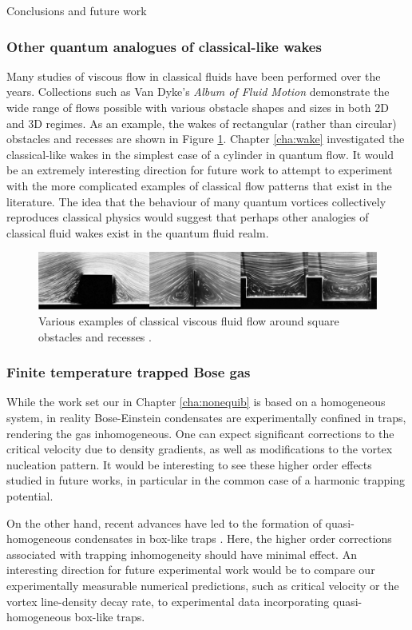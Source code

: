 \begin{chapter}{\label{cha:conc}Conclusions and future work}
\subsubsection{Other quantum analogues of classical-like wakes}
Many studies of viscous flow in classical fluids have been performed over the years. Collections such as Van Dyke's {\it Album of Fluid Motion} \cite{nagib} demonstrate the wide range of flows possible with various obstacle shapes and sizes in both 2D and 3D regimes. As an example, the wakes of rectangular (rather than circular) obstacles and recesses are shown in Figure \ref{fig:dyke-imgs}. Chapter \ref{cha:wake} investigated the classical-like wakes in the simplest case of a cylinder in quantum flow. It would be an extremely interesting direction for future work to attempt to experiment with the more complicated examples of classical flow patterns that exist in the literature. The idea that the behaviour of many quantum vortices collectively reproduces classical physics would suggest that perhaps other analogies of classical fluid wakes exist in the quantum fluid realm. 
\begin{figure}
\centering
    \includegraphics[width=\linewidth]{wake/square.png}
  \caption{Various examples of classical viscous fluid flow around square obstacles and recesses \cite{nagib}.} 
  \label{fig:dyke-imgs}
\end{figure}

\subsubsection{Finite temperature trapped Bose gas}
While the work set our in Chapter \ref{cha:nonequib} is based on a homogeneous system, in reality Bose-Einstein condensates are experimentally confined in traps, rendering the gas inhomogeneous. One can expect significant corrections to the critical velocity due to density gradients, as well as modifications to the vortex nucleation pattern. It would be interesting to see these higher order effects studied in future works, in particular in the common case of a harmonic trapping potential.

On the other hand, recent advances have led to the formation of quasi-homogeneous condensates in box-like traps \cite{gaunt_2013,chomaz_2015}. Here, the higher order corrections associated with trapping inhomogeneity should have minimal effect. An interesting direction for future experimental work would be to compare our experimentally measurable numerical predictions, such as critical velocity or the vortex line-density decay rate, to experimental data incorporating quasi-homogeneous box-like traps.


\end{chapter}
